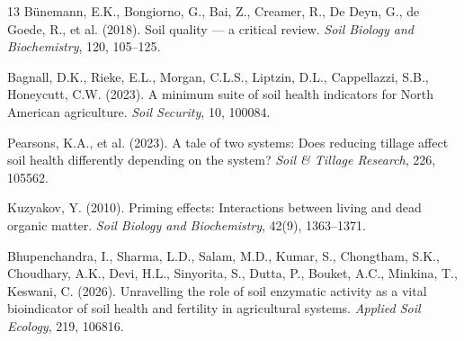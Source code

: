 \documentclass{ai4science_ysda}
\begin{document}
\begin{thebibliography}{13}
Bünemann, E.K., Bongiorno, G., Bai, Z., Creamer, R., De Deyn, G., de Goede, R.,
et al. (2018). Soil quality --- a critical review. \emph{Soil Biology and
Biochemistry}, 120, 105--125.

Bagnall, D.K., Rieke, E.L., Morgan, C.L.S., Liptzin, D.L., Cappellazzi, S.B.,
Honeycutt, C.W. (2023). A minimum suite of soil health indicators for North
American agriculture. \emph{Soil Security}, 10, 100084.

Pearsons, K.A., et al. (2023). A tale of two systems: Does reducing tillage
affect soil health differently depending on the system? \emph{Soil \& Tillage
Research}, 226, 105562.

Kuzyakov, Y. (2010). Priming effects: Interactions between living and dead
organic matter. \emph{Soil Biology and Biochemistry}, 42(9), 1363--1371.

Bhupenchandra, I., Sharma, L.D., Salam, M.D., Kumar, S., Chongtham, S.K.,
Choudhary, A.K., Devi, H.L., Sinyorita, S., Dutta, P., Bouket, A.C.,
Minkina, T., Keswani, C. (2026). Unravelling the role of soil enzymatic
activity as a vital bioindicator of soil health and fertility in agricultural
systems. \emph{Applied Soil Ecology}, 219, 106816.
\end{thebibliography}
\end{document}
